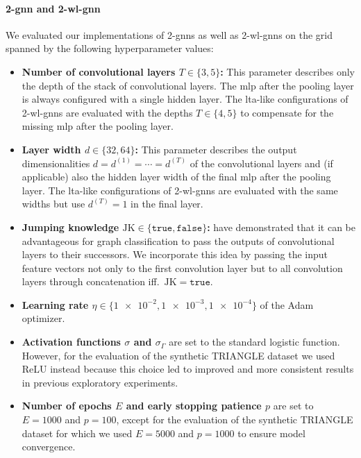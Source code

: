 \paragraph{2-\acs{gnn} and 2-\acs{wl}-\acs{gnn}}
We evaluated our implementations of 2-\acsp{gnn} as well as 2-\acs{wl}-\acsp{gnn} on the grid spanned by the following hyperparameter values:
\begin{itemize}[itemsep=2pt,parsep=2pt]
	\item \textbf{Number of convolutional layers $T \in \{ 3, 5 \}$:}
		This parameter describes only the depth of the stack of convolutional layers.
		The \ac{mlp} after the pooling layer is always configured with a single hidden layer.
		The \acs{lta}-like configurations of 2-\acs{wl}-\acsp{gnn} are evaluated with the depths $T \in \{ 4, 5 \}$ to compensate for the missing \ac{mlp} after the pooling layer.
	\item \textbf{Layer width $d \in \{ 32, 64 \}$:}
		This parameter describes the output dimensionalities $d = d^{(1)} = \cdots = d^{(T)}$ of the convolutional layers and (if applicable) also the hidden layer width of the final \ac{mlp} after the pooling layer.
		The \acs{lta}-like configurations of 2-\acs{wl}-\acsp{gnn} are evaluated with the same widths but use $d^{(T)} = 1$ in the final layer.
	\item \textbf{Jumping knowledge $\mathrm{JK} \in \{ \mathtt{true}, \mathtt{false} \}$:}
		\citet{Xu2018a} have demonstrated that it can be advantageous for graph classification to pass the outputs of convolutional layers to their successors.
		We incorporate this idea by passing the input feature vectors not only to the first convolution layer but to all convolution layers through concatenation iff.\ $\mathrm{JK} = \mathtt{true}$.
	\item \textbf{Learning rate $\eta \in \{ \num{1e-2}, \num{1e-3}, \num{1e-4} \}$} of the Adam optimizer.
	\item \textbf{Activation functions $\sigma$ and $\sigma_{\Gamma}$} are set to the standard logistic function.
		However, for the evaluation of the synthetic TRIANGLE dataset we used ReLU instead because this choice led to improved and more consistent results in previous exploratory experiments.
	\item \textbf{Number of epochs $E$ and early stopping patience $p$} are set to $E = 1000$ and $p = 100$, except for the evaluation of the synthetic TRIANGLE dataset for which we used $E = 5000$ and $p = 1000$ to ensure model convergence.
\end{itemize}

